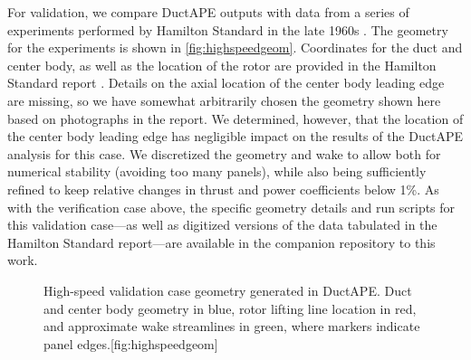 For validation, we compare DuctAPE outputs with data from a series of experiments performed by Hamilton Standard in the late 1960s \cite{HS_1968}.
%
The geometry for the experiments is shown in \cref{fig:highspeedgeom}.
%
Coordinates for the duct and center body, as well as the location of the rotor are provided in the Hamilton Standard report \cite{HS_1968}.
%
Details on the axial location of the center body leading edge are missing, so we have somewhat arbitrarily chosen the geometry shown here based on photographs in the report.
%
We determined, however, that the location of the center body leading edge has negligible impact on the results of the DuctAPE analysis for this case.
%
We discretized the geometry and wake to allow both for numerical stability (avoiding too many panels), while also being sufficiently refined to keep relative changes in thrust and power coefficients below 1\%.
%
As with the verification case above, the specific geometry details and run scripts for this validation case---as well as digitized versions of the data tabulated in the Hamilton Standard report---are available in the companion repository to this work.

\begin{figure}[h!]
     \centering
     \setlength{\sidecapraise}{-2.5cm}
     \begin{sidecaption}{High-speed validation case geometry generated in DuctAPE. Duct and center body geometry in blue, rotor lifting line location in red, and approximate wake streamlines in green, where markers indicate panel edges.}[fig:highspeedgeom]
 \end{sidecaption}
 \vskip -3cm
\end{figure}


%

